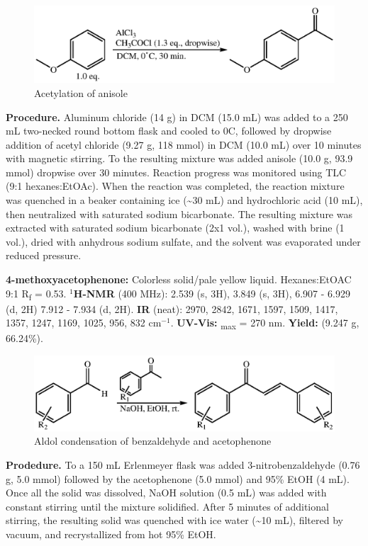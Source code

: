 \documentclass[12pt]{article}
\let\bf\textbf
\begin{document}
\begin{figure}[ht]
    \centering
    \includegraphics[scale=0.8]{schemes/acetylation.eps}
    \caption{Acetylation of anisole}
\end{figure}
\noindent\bf{Procedure.} Aluminum chloride (14 g) in DCM (15.0 mL) was added to a 250 mL two-necked round bottom flask and cooled to 0\degree C, followed by dropwise addition of acetyl chloride (9.27 g, 118 mmol) in DCM (10.0 mL) over 10 minutes with magnetic stirring. To the resulting mixture was added anisole (10.0 g, 93.9 mmol) dropwise over 30 minutes. Reaction progress was monitored using TLC (9:1 hexanes:EtOAc). When the reaction was completed, the reaction mixture was quenched in a beaker containing ice (\textasciitilde 30 mL) and hydrochloric acid (10 mL), then neutralized with saturated sodium bicarbonate. The resulting mixture was extracted with saturated sodium bicarbonate (2x1 vol.), washed with brine (1 vol.), dried with anhydrous sodium sulfate, and the solvent was evaporated under reduced pressure.

\noindent\bf{4-methoxyacetophenone:} Colorless solid/pale yellow liquid. Hexanes:EtOAC 9:1 R\textsubscript{f} = 0.53. \bf{$^1$H-NMR} (400 MHz): \textdelta\hspace{0mm} 2.539 (s, 3H), 3.849 (s, 3H), 6.907 - 6.929 (d, 2H) 7.912 - 7.934 (d, 2H). \bf{IR} (neat): 2970, 2842, 1671, 1597, 1509, 1417, 1357, 1247, 1169, 1025, 956, 832 cm$^{-1}$. \bf{UV-Vis:} \textlambda\textsubscript{max} = 270 nm. \bf{Yield:} (9.247 g, 66.24\%).

\begin{figure}[H]
    \centering
    \includegraphics[scale=0.8]{schemes/chalcone.eps}
    \caption{Aldol condensation of benzaldehyde and acetophenone}
\end{figure}
\noindent\bf{Prodedure.} To a 150 mL Erlenmeyer flask was added 3-nitrobenzaldehyde (0.76 g, 5.0 mmol) followed by the acetophenone (5.0 mmol) and 95\% EtOH (4 mL). Once all the solid was dissolved, NaOH solution (0.5 mL) was added with constant stirring until the mixture solidified. After 5 minutes of additional stirring, the resulting solid was quenched with ice water (\textasciitilde 10 mL), filtered by vacuum, and recrystallized from hot 95\% EtOH.
\end{document}
